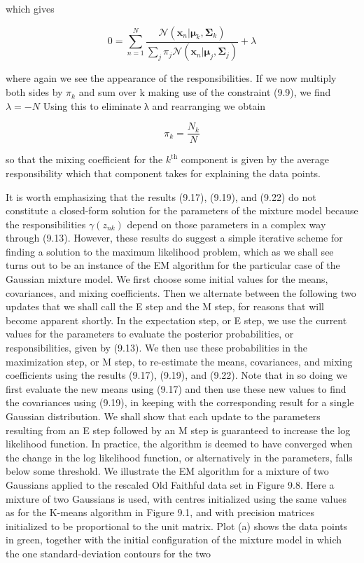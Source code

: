 \documentclass[
  10
]{article}
\begin{document}
which gives

\[
0 = \sum_ {n = 1} ^ {N} \frac {\mathcal {N} (\mathbf {x} _ {n} | \boldsymbol {\mu} _ {k} , \boldsymbol {\Sigma} _ {k})}{\sum_ {j} \pi_ {j} \mathcal {N} (\mathbf {x} _ {n} | \boldsymbol {\mu} _ {j} , \boldsymbol {\Sigma} _ {j})} + \lambda\tag{9.21}
\]

where again we see the appearance of the responsibilities. If we now
multiply both sides by \(\pi _ { k }\) and sum over k making use of the
constraint (9.9), we find \(\lambda = - N\) Using this to eliminate λ
and rearranging we obtain

\[
\pi_ {k} = \frac {N _ {k}}{N}\tag{9.22}
\]

so that the mixing coefficient for the \(k ^ { \mathrm { t h } }\)
component is given by the average responsibility which that component
takes for explaining the data points.

It is worth emphasizing that the results (9.17), (9.19), and (9.22) do
not constitute a closed-form solution for the parameters of the mixture
model because the responsibilities \(\gamma ( z _ { n k } )\) depend on
those parameters in a complex way through (9.13). However, these results
do suggest a simple iterative scheme for finding a solution to the
maximum likelihood problem, which as we shall see turns out to be an
instance of the EM algorithm for the particular case of the Gaussian
mixture model. We first choose some initial values for the means,
covariances, and mixing coefficients. Then we alternate between the
following two updates that we shall call the E step and the M step, for
reasons that will become apparent shortly. In the expectation step, or E
step, we use the current values for the parameters to evaluate the
posterior probabilities, or responsibilities, given by (9.13). We then
use these probabilities in the maximization step, or M step, to
re-estimate the means, covariances, and mixing coefficients using the
results (9.17), (9.19), and (9.22). Note that in so doing we first
evaluate the new means using (9.17) and then use these new values to
find the covariances using (9.19), in keeping with the corresponding
result for a single Gaussian distribution. We shall show that each
update to the parameters resulting from an E step followed by an M step
is guaranteed to increase the log likelihood function. In practice, the
algorithm is deemed to have converged when the change in the log
likelihood function, or alternatively in the parameters, falls below
some threshold. We illustrate the EM algorithm for a mixture of two
Gaussians applied to the rescaled Old Faithful data set in Figure 9.8.
Here a mixture of two Gaussians is used, with centres initialized using
the same values as for the K-means algorithm in Figure 9.1, and with
precision matrices initialized to be proportional to the unit matrix.
Plot (a) shows the data points in green, together with the initial
configuration of the mixture model in which the one standard-deviation
contours for the two
\end{document}
